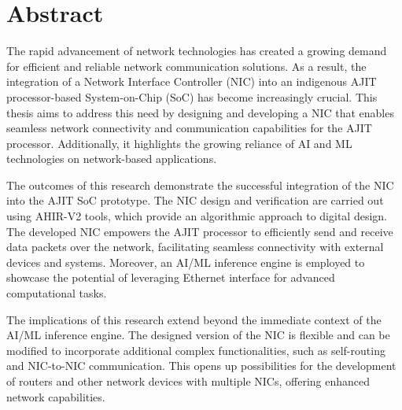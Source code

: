 \documentclass[a4paper,11pt, final]{report}
\begin{document}

\chapter*{Abstract} 

The rapid advancement of network technologies has created a growing demand for efficient and reliable network communication solutions. As a result, the integration of a Network Interface Controller (NIC) into an indigenous AJIT processor-based System-on-Chip (SoC) has become increasingly crucial. This thesis aims to address this need by designing and developing a NIC that enables seamless network connectivity and communication capabilities for the AJIT processor. Additionally, it highlights the growing reliance of AI and ML technologies on network-based applications.

The outcomes of this research demonstrate the successful integration of the NIC into the AJIT SoC prototype. The NIC design and verification are carried out using AHIR-V2 tools, which provide an algorithmic approach to digital design. The developed NIC empowers the AJIT processor to efficiently send and receive data packets over the network, facilitating seamless connectivity with external devices and systems. Moreover, an AI/ML inference engine is employed to showcase the potential of leveraging Ethernet interface for advanced computational tasks.

The implications of this research extend beyond the immediate context of the AI/ML inference engine. The designed version of the NIC is flexible and can be modified to incorporate additional complex functionalities, such as self-routing and NIC-to-NIC communication. This opens up possibilities for the development of routers and other network devices with multiple NICs, offering enhanced network capabilities.
\end{document}
